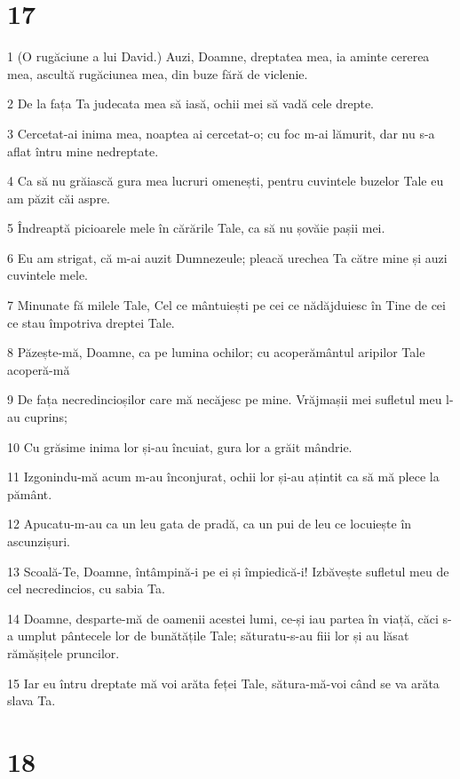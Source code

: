 \chapter{17}

\par 1 (O rugăciune a lui David.) Auzi, Doamne, dreptatea mea, ia aminte cererea mea, ascultă rugăciunea mea, din buze fără de viclenie.
\par 2 De la fața Ta judecata mea să iasă, ochii mei să vadă cele drepte.
\par 3 Cercetat-ai inima mea, noaptea ai cercetat-o; cu foc m-ai lămurit, dar nu s-a aflat întru mine nedreptate.
\par 4 Ca să nu grăiască gura mea lucruri omenești, pentru cuvintele buzelor Tale eu am păzit căi aspre.
\par 5 Îndreaptă picioarele mele în cărările Tale, ca să nu șovăie pașii mei.
\par 6 Eu am strigat, că m-ai auzit Dumnezeule; pleacă urechea Ta către mine și auzi cuvintele mele.
\par 7 Minunate fă milele Tale, Cel ce mântuiești pe cei ce nădăjduiesc în Tine de cei ce stau împotriva dreptei Tale.
\par 8 Păzește-mă, Doamne, ca pe lumina ochilor; cu acoperământul aripilor Tale acoperă-mă
\par 9 De fața necredincioșilor care mă necăjesc pe mine. Vrăjmașii mei sufletul meu l-au cuprins;
\par 10 Cu grăsime inima lor și-au încuiat, gura lor a grăit mândrie.
\par 11 Izgonindu-mă acum m-au înconjurat, ochii lor și-au ațintit ca să mă plece la pământ.
\par 12 Apucatu-m-au ca un leu gata de pradă, ca un pui de leu ce locuiește în ascunzișuri.
\par 13 Scoală-Te, Doamne, întâmpină-i pe ei și împiedică-i! Izbăvește sufletul meu de cel necredincios, cu sabia Ta.
\par 14 Doamne, desparte-mă de oamenii acestei lumi, ce-și iau partea în viață, căci s-a umplut pântecele lor de bunătățile Tale; săturatu-s-au fiii lor și au lăsat rămășițele pruncilor.
\par 15 Iar eu întru dreptate mă voi arăta feței Tale, sătura-mă-voi când se va arăta slava Ta.

\chapter{18}

